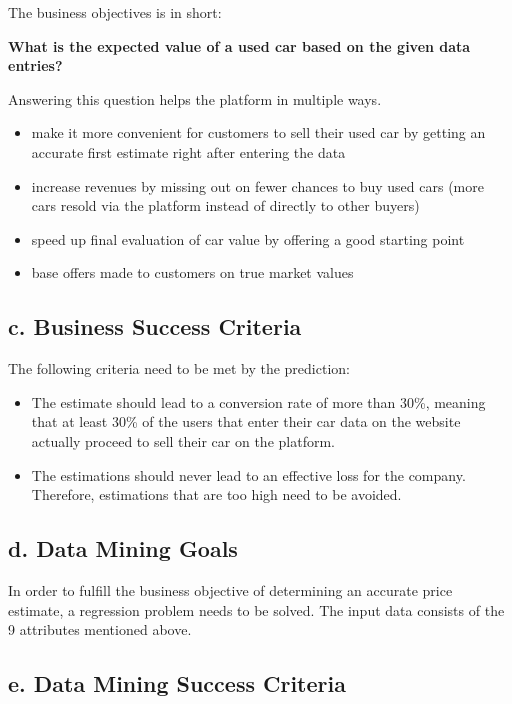 \documentclass[sigchi]{acmart}
\def\tightlist{}
\begin{document}
The business objectives is in short:

\textbf{What is the expected value of a used car based on the given data entries?}

Answering this question helps the platform in multiple ways.

\begin{itemize}
\tightlist
\item
  make it more convenient for customers to sell their used car by getting an accurate first estimate right after entering the data
\item
  increase revenues by missing out on fewer chances to buy used cars (more cars resold via the platform instead of directly to other buyers)
\item
  speed up final evaluation of car value by offering a good starting point
\item
  base offers made to customers on true market values
\end{itemize}

\hypertarget{c.-business-success-criteria}{%
\subsection{c. Business Success Criteria}\label{c.-business-success-criteria}}

The following criteria need to be met by the prediction:

\begin{itemize}
\item
  The estimate should lead to a conversion rate of more than 30\%, meaning that at least 30\% of the users that enter their car data on the website actually proceed to sell their car on the platform.
\item
  The estimations should never lead to an effective loss for the company. Therefore, estimations that are too high need to be avoided.
\end{itemize}

\hypertarget{d.-data-mining-goals}{%
\subsection{d. Data Mining Goals}\label{d.-data-mining-goals}}

In order to fulfill the business objective of determining an accurate price estimate, a regression problem needs to be solved. The input data consists of the 9 attributes mentioned above.

\hypertarget{e.-data-mining-success-criteria}{%
\subsection{e. Data Mining Success Criteria}\label{e.-data-mining-success-criteria}}
\end{document}
